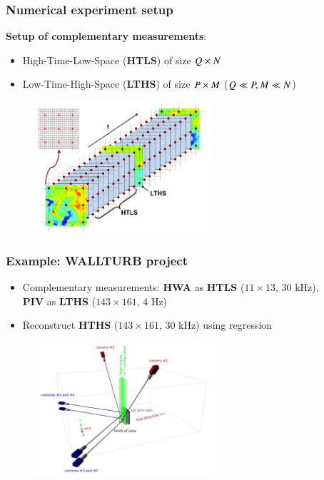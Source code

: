 \documentclass{beamer}
\let\olditem\item
\renewcommand{\item}{\setlength{\itemsep}{\fill}\olditem}
\begin{document}
\begin{frame}
\frametitle{Numerical experiment setup}
	\begin{block}{\textbf{Setup of complementary measurements}:}
		\begin{itemize}
			\item High-Time-Low-Space (\textbf{HTLS}) of size $ Q \times N $
			\item Low-Time-High-Space (\textbf{LTHS}) of size $ P \times M $ ($ Q \ll  P, M \ll  N$)
		\end{itemize}
	\end{block}
	\vfill
	\begin{figure}
	\centering \includegraphics[width=0.58\textwidth]{./figures/experimentalsetup/experiment_setup.png}
	\end{figure}
\end{frame}

\begin{frame}
\frametitle{Example: WALLTURB project {\footnotesize \cite{coudert2011double}}}
	\vspace{-0.1cm}
	\begin{itemize}
		\item Complementary measurements: \textbf{HWA} as \textbf{HTLS} ($ 11 \times 13 $, 30 kHz), \\ \textbf{PIV} as \textbf{LTHS} ($ 143 \times 161 $, 4 Hz)
		\item Reconstruct \textbf{HTHS} ($ 143 \times 161 $, 30 kHz) using regression {\footnotesize \cite{Dekou2016}}
	\end{itemize}
	\vspace{-0.2cm}
	\begin{figure}
	\centering \includegraphics[width=0.6\textwidth]{./figures/experimentalsetup/Windtunnel4.png}
	\end{figure}		
\end{frame}
\end{document}
